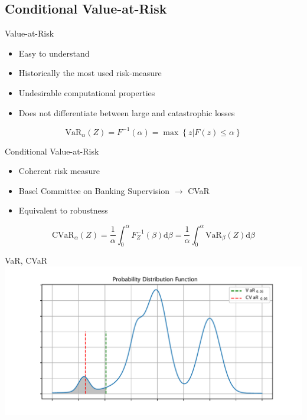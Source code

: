 \documentclass{beamer}
\begin{document}
\subsection{Conditional Value-at-Risk}


\begin{frame}{Value-at-Risk}

\begin{itemize}
\item Easy to understand
\item Historically the most used risk-measure
\item Undesirable computational properties
\item Does not differentiate between large and catastrophic losses
\end{itemize}

$$
\text{VaR}_\alpha(Z)=F^{-1}(\alpha)=\max\left\lbrace z | F(z) \le \alpha \right\rbrace
$$

\end{frame}

\begin{frame}{Conditional Value-at-Risk}

\begin{itemize}
\item Coherent risk measure
\item Basel Committee on Banking Supervision $\to$ CVaR
\item Equivalent to robustness
\end{itemize}

$$
\text{CVaR}_\alpha(Z) = \dfrac{1}{\alpha}\int_0^\alpha F^{-1}_Z(\beta) \text{d}\beta = \dfrac{1}{\alpha}\int_0^\alpha \text{VaR}_\beta(Z) \text{d}\beta
$$

\end{frame}


\begin{frame}{VaR, CVaR}
\includegraphics[width=\linewidth]{../gfx/pdf.pdf}
\end{frame}
\end{document}

